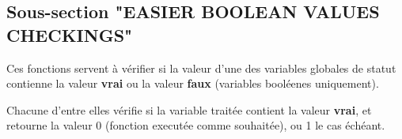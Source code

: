 \documentclass[a4paper,10pt]{article}
\begin{document}
\subsection{Sous-section "EASIER BOOLEAN VALUES CHECKINGS"}\color{text}

\begin{justify}
    Ces fonctions servent à vérifier si la valeur d'une des variables globales de statut contienne la valeur \textbf{vrai} ou la valeur \textbf{faux} (variables booléenes uniquement).
\end{justify}

\begin{justify}
    Chacune d'entre elles vérifie si la variable traitée contient la valeur \textbf{vrai}, et retourne la valeur 0 (fonction executée comme souhaitée), ou 1 le cas échéant.
\end{justify}
\end{document}

